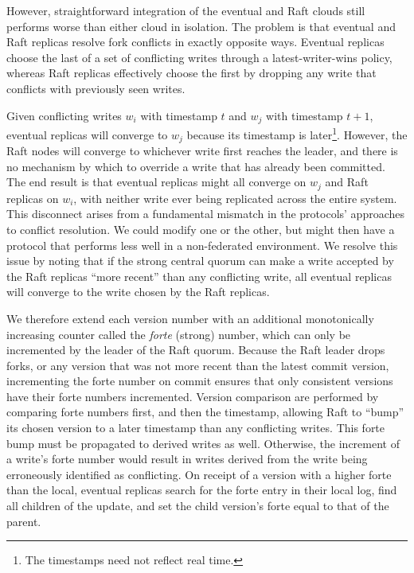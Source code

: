 \documentclass[10pt,conference,letterpaper]{IEEEtran}
\begin{document}
However, straightforward integration of the eventual and Raft clouds still
performs worse than either cloud in isolation.
The problem is that eventual and Raft replicas resolve fork conflicts in
exactly opposite ways.
Eventual replicas choose the last of a set of conflicting writes through a
latest-writer-wins policy, whereas Raft replicas effectively choose the first
by dropping any write that conflicts with previously seen writes.

Given conflicting writes $w_i$ with timestamp $t$ and $w_j$ with timestamp
$t+1$, eventual replicas will converge to $w_j$ because its timestamp is
later\footnote{The timestamps need not reflect real time.}.
However, the Raft nodes will converge to whichever write first reaches the
leader, and there is no mechanism by which to override a write that has already
been committed.
The end result is that eventual replicas might all converge on $w_j$ and
Raft replicas on $w_i$, with neither write ever being replicated across
the entire system.
This disconnect arises from a fundamental mismatch in the protocols'
approaches to conflict resolution.
We could modify one or the other, but might then have a protocol that performs
less well in a non-federated environment.
We resolve this issue by noting that if the strong central quorum can make a
write accepted by the Raft replicas ``more recent'' than any conflicting
write, all eventual replicas will converge to the write chosen by the Raft
replicas.

We therefore extend each version number with an additional monotonically
increasing counter called the \textit{forte} (strong) number, which can only
be incremented by the leader of the Raft quorum.
Because the Raft leader drops forks, or any version that was not more recent
than the latest commit version, incrementing the forte number on commit
ensures that only consistent versions have their forte numbers incremented.
Version comparison are performed by comparing forte
numbers first, and then the timestamp, allowing Raft to ``bump'' its chosen
version to a later timestamp than any conflicting writes.
This forte bump must be propagated to derived writes as well.
Otherwise, the increment of a write's forte number would result in writes
derived from the write being erroneously identified as conflicting.
On receipt of a version with a higher forte than the local, eventual replicas
search for the forte entry in their local log, find all children of the
update, and set the child version's forte equal to that of the parent.
\end{document}
